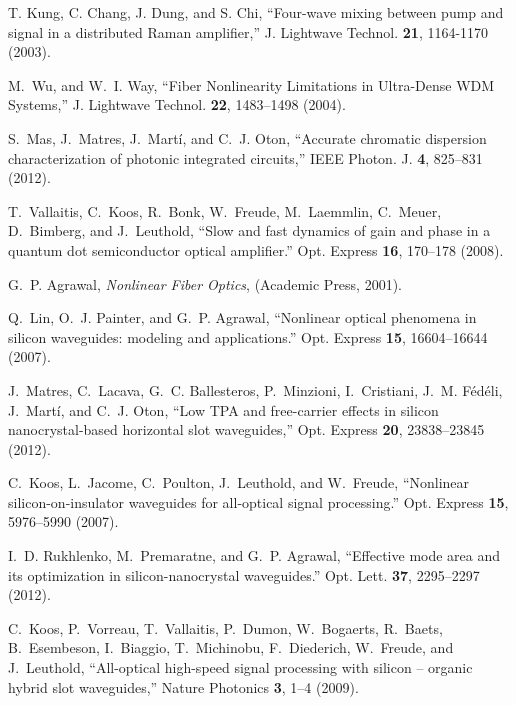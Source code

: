 \documentclass[10pt,letterpaper]{article}
\begin{document}
\begin{thebibliography}{10}
T. Kung, C. Chang, J. Dung, and S. Chi, \enquote{{Four-wave mixing between pump and signal in a distributed
  Raman amplifier},}  J. Lightwave Technol. \textbf{21}, 1164-1170 (2003).


M.~Wu, and W.~I. Way, \enquote{{Fiber Nonlinearity Limitations in Ultra-Dense WDM Systems},} J. Lightwave Technol. \textbf{22}, 1483--1498 (2004).


S.~Mas, J.~Matres, J.~Mart\'i, and C.~J. Oton, \enquote{{Accurate chromatic
  dispersion characterization of photonic integrated circuits},} IEEE Photon. J. \textbf{4}, 825--831 (2012).


T.~Vallaitis, C.~Koos, R.~Bonk, W.~Freude, M.~Laemmlin, C.~Meuer, D.~Bimberg,
  and J.~Leuthold, \enquote{{Slow and fast dynamics of gain and phase in a
  quantum dot semiconductor optical amplifier.}} Opt. Express \textbf{16},
  170--178 (2008).

G.~P. Agrawal, \emph{{Nonlinear Fiber Optics}}, (Academic Press, 2001).

Q.~Lin, O.~J. Painter, and G.~P. Agrawal, \enquote{{Nonlinear optical phenomena
  in silicon waveguides: modeling and applications.}} Opt. Express
  \textbf{15}, 16604--16644 (2007).

J.~Matres, C.~Lacava, G.~C. Ballesteros, P.~Minzioni, I.~Cristiani, J.~M.
  F\'{e}d\'{e}li, J.~Mart\'i, and C.~J. Oton, \enquote{{Low TPA and
  free-carrier effects in silicon nanocrystal-based horizontal slot
  waveguides},} Opt. Express \textbf{20}, 23838--23845 (2012).

C.~Koos, L.~Jacome, C.~Poulton, J.~Leuthold, and W.~Freude, \enquote{{Nonlinear
  silicon-on-insulator waveguides for all-optical signal processing.}} Opt. Express \textbf{15}, 5976--5990 (2007).

I.~D. Rukhlenko, M.~Premaratne, and G.~P. Agrawal, \enquote{{Effective mode
  area and its optimization in silicon-nanocrystal waveguides.}} Opt. Lett.
  \textbf{37}, 2295--2297 (2012).

C.~Koos, P.~Vorreau, T.~Vallaitis, P.~Dumon, W.~Bogaerts, R.~Baets,
  B.~Esembeson, I.~Biaggio, T.~Michinobu, F.~Diederich, W.~Freude, and
  J.~Leuthold, \enquote{{All-optical high-speed signal processing with silicon
  – organic hybrid slot waveguides},} Nature Photonics \textbf{3}, 1--4
  (2009).
\end{thebibliography}
\end{document}
